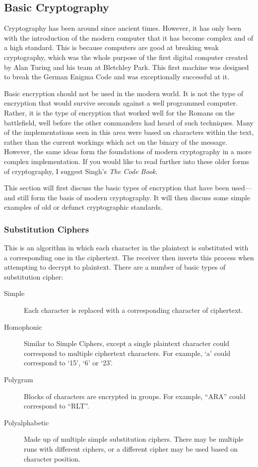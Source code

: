 		\subsection{Basic Cryptography}
			Cryptography has been around since ancient times.
			However, it has only been with the introduction of the modern computer that it has become complex and of a high standard.
			This is because computers are good at breaking weak cryptography, which was the whole purpose of the first digital computer created by Alan Turing and his team at Bletchley Park.
			This first machine was designed to break the German Enigma Code and was exceptionally successful at it.

			Basic encryption should not be used in the modern world.
			It is not the type of encryption that would survive seconds against a well programmed computer.
			Rather, it is the type of encryption that worked well for the Romans on the battlefield, well before the other commanders had heard of such techniques.
			Many of the implementations seen in this area were based on characters within the text,
			rather than the current workings which act on the binary of the message.
			However, the same ideas form the foundations of modern cryptography in a more complex implementation.
			If you would like to read further into these older forms of cryptography, I suggest Singh's \textit{The Code Book}\cite{CodeBook}.

			This section will first discuss the basic types of encryption that have been used---and still form the basis of modern cryptography.
			It will then discuss some simple examples of old or defunct cryptographic standards.

			\subsubsection{Substitution Ciphers}
				This is an algorithm in which each character in the plaintext is substituted with a corresponding one in the ciphertext.
				The receiver then inverts this process when attempting to decrypt to plaintext.
				There are a number of basic types of substitution cipher:
				\begin{description}
					\item[Simple] Each character is replaced with a corresponding character of ciphertext.
					\item[Homophonic] Similar to Simple Ciphers, except a single plaintext character could correspond to multiple ciphertext characters.
						For example, `a' could correspond to `15', `6' or `23'.
					\item[Polygram] Blocks of characters are encrypted in groups.
						For example, ``ARA'' could correspond to ``RLT''.
					\item[Polyalphabetic] Made up of multiple simple substitution ciphers.
						There may be multiple runs with different ciphers, or a different cipher may be used based on character position.
				\end{description}

